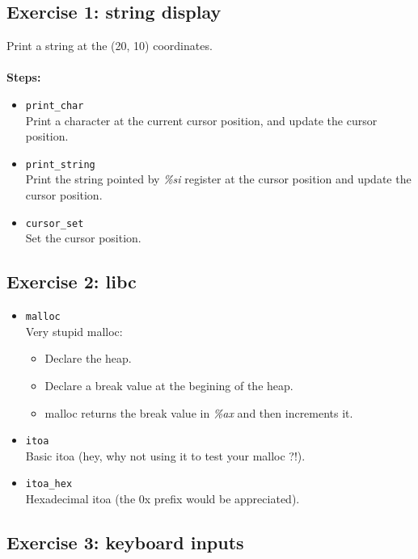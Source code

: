 \subsection*{Exercise 1: string display}
Print a string at the (20, 10) coordinates.\\
\\
{\bf Steps:}
\begin{itemize}
\item {\tt print\_char}\\
Print a character at the current cursor position, and update the cursor position.
\item {\tt print\_string}\\
Print the string pointed by {\em \%si} register at the cursor position and update the cursor position.
\item{\tt cursor\_set}\\
Set the cursor position.
\end{itemize}




\subsection*{Exercise 2: libc}


  \begin{itemize}
  \item {\tt malloc}\\
  Very stupid malloc:
  \begin{itemize}
  \item Declare the heap.
  \item Declare a break value at the begining of the heap.
  \item malloc returns the break value in {\em \%ax} and then increments it.
  \end{itemize}
  \item {\tt itoa}\\
  Basic itoa (hey, why not using it to test your malloc ?!).
  \item {\tt itoa\_hex}\\
  Hexadecimal itoa (the 0x prefix would be appreciated).
  \end{itemize}


\subsection*{Exercise 3: keyboard inputs}

